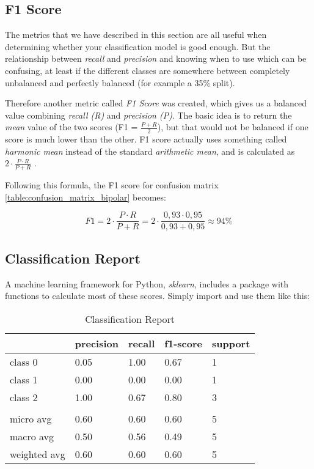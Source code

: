 \subsection{F1 Score}

The metrics that we have described in this section are all useful when determining whether your classification model is good enough. 
But the relationship between \textit{recall} and \textit{precision} and knowing when to use which can be confusing, at least if the different classes
are somewhere between completely unbalanced and perfectly balanced (for example a 35\% split). 

Therefore another metric called \textit{F1 Score} was created, which gives us a balanced value combining \textit{recall (R)} and \textit{precision (P)}.
The basic idea is to return the \textit{mean} value of the two scores (F1 = $ \frac{P + R}{2} $), but that would not be balanced if one score is
much lower than the other. F1 score actually uses something called \textit{harmonic mean} instead of the standard \textit{arithmetic mean}, 
and is calculated as $ 2 \cdot \frac{P \cdot R}{P + R} $ \cite{ml_metrics}. 

Following this formula, the F1 score for confusion matrix \ref{table:confusion_matrix_bipolar} becomes:

\[
  F1 = 2 \cdot \frac{P \cdot R}{P + R} = 2 \cdot \frac{0,93 \cdot 0,95}{0,93 + 0,95} \approx 94\%
\]

\subsection{Classification Report}

A machine learning framework for Python, \textit{sklearn}, includes a package with functions to calculate most of these scores. 
Simply import and use them like this: 



\begin{table}
  \begin{tabular}{| l | l | l | l | l |}
    \hline
                  & precision & recall  & f1-score & support \\ \hline
    class 0       & 0.05      & 1.00    & 0.67    & 1        \\
    class 1       & 0.00      & 0.00    & 0.00    & 1        \\
    class 2       & 1.00      & 0.67    & 0.80    & 3        \\
                  &           &         &         &          \\ 
    micro avg     & 0.60      & 0.60    & 0.60    & 5        \\
    macro avg     & 0.50      & 0.56    & 0.49    & 5        \\
    weighted avg  & 0.60      & 0.60    & 0.60    & 5        \\
    \hline
  \end{tabular}
  \caption{Classification Report}
  \label{table:classification_report}
\end{table}

